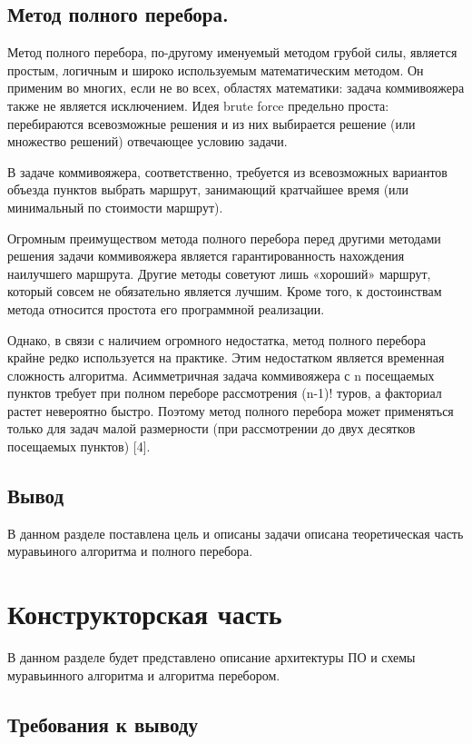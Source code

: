 \documentclass[a4paper,oneside,14pt]{extreport}
\begin{document}
\section{Метод полного перебора.}

Метод полного перебора, по-другому именуемый методом грубой силы, является простым, логичным и широко используемым
математическим методом. Он применим во многих, если не во всех,
областях математики: задача коммивояжера также не является исключением.
Идея brute force предельно проста: перебираются всевозможные
решения и из них выбирается решение (или множество решений) отвечающее
условию задачи.

В задаче коммивояжера, соответственно, требуется из всевозможных
вариантов объезда пунктов выбрать маршрут, занимающий кратчайшее время
(или минимальный по стоимости маршрут).

Огромным преимуществом метода полного перебора перед другими
методами решения задачи коммивояжера является гарантированность
нахождения наилучшего маршрута. Другие методы советуют лишь
«хороший» маршрут, который совсем не обязательно является лучшим. Кроме
того, к достоинствам метода относится простота его программной реализации.

Однако, в связи с наличием огромного недостатка, метод полного
перебора крайне редко используется на практике. Этим недостатком является
временная сложность алгоритма. Асимметричная задача коммивояжера с n
посещаемых пунктов требует при полном переборе рассмотрения (n-1)! туров,
а факториал  растет невероятно быстро. Поэтому метод полного перебора может применяться только для задач
малой размерности (при рассмотрении до двух десятков посещаемых
пунктов) [4].

\section*{Вывод}

В данном разделе поставлена цель и описаны задачи описана теоретическая часть муравьиного алгоритма и полного перебора.
\newpage

\chapter{Конструкторская часть}
В данном разделе будет представлено описание архитектуры ПО и схемы  муравьинного алгоритма и алгоритма перебором.

\section{Требования к выводу}
\end{document}
